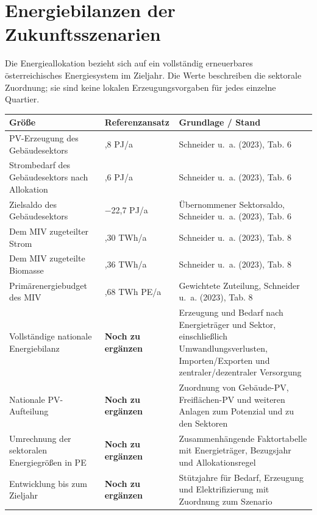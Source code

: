 \documentclass[
  ngerman,
  a4paper,
  DIV=11]{scrreprt}
\newcounter{none} %
\begin{document}
\section{Energiebilanzen der
Zukunftsszenarien}\label{energiebilanzen-der-zukunftsszenarien}

Die Energieallokation bezieht sich auf ein vollständig erneuerbares
österreichisches Energiesystem im Zieljahr. Die Werte beschreiben die
sektorale Zuordnung; sie sind keine lokalen Erzeugungsvorgaben für jedes
einzelne Quartier.

{\def\LTcaptype{none} %
\begin{longtable}[]{@{}
  >{\raggedright\arraybackslash}p{}
  >{\raggedright\arraybackslash}p{}
  >{\raggedright\arraybackslash}p{}@{}}
\toprule\noalign{}
\begin{minipage}[b]{\linewidth}\raggedright
Größe
\end{minipage} & \begin{minipage}[b]{\linewidth}\raggedright
Referenzansatz
\end{minipage} & \begin{minipage}[b]{\linewidth}\raggedright
Grundlage / Stand
\end{minipage} \\
\midrule\noalign{}
\endhead
\bottomrule\noalign{}
\endlastfoot
PV-Erzeugung des Gebäudesektors & 114,8 PJ/a & Schneider u.~a. (2023),
Tab. 6 \\
Strombedarf des Gebäudesektors nach Allokation & 137,6 PJ/a & Schneider
u.~a. (2023), Tab. 6 \\
Zielsaldo des Gebäudesektors & −22,7 PJ/a & Übernommener Sektorsaldo,
Schneider u.~a. (2023), Tab. 6 \\
Dem MIV zugeteilter Strom & 6,30 TWh/a & Schneider u.~a. (2023), Tab.
8 \\
Dem MIV zugeteilte Biomasse & 0,36 TWh/a & Schneider u.~a. (2023), Tab.
8 \\
Primärenergiebudget des MIV & 10,68 TWh PE/a & Gewichtete Zuteilung,
Schneider u.~a. (2023), Tab. 8 \\
Vollständige nationale Energiebilanz & \textbf{Noch zu ergänzen} &
Erzeugung und Bedarf nach Energieträger und Sektor, einschließlich
Umwandlungsverlusten, Importen/Exporten und zentraler/dezentraler
Versorgung \\
Nationale PV-Aufteilung & \textbf{Noch zu ergänzen} & Zuordnung von
Gebäude-PV, Freiflächen-PV und weiteren Anlagen zum Potenzial und zu den
Sektoren \\
Umrechnung der sektoralen Energiegrößen in PE & \textbf{Noch zu
ergänzen} & Zusammenhängende Faktortabelle mit Energieträger, Bezugsjahr
und Allokationsregel \\
Entwicklung bis zum Zieljahr & \textbf{Noch zu ergänzen} & Stützjahre
für Bedarf, Erzeugung und Elektrifizierung mit Zuordnung zum Szenario \\
\end{longtable}
}
\end{document}
